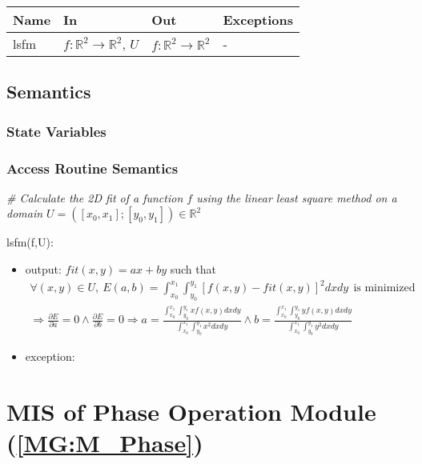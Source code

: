 \documentclass[12pt, titlepage]{article}
\begin{document}
\begin{center}
\begin{tabular}{p{2cm} p{4cm} p{4cm} p{2cm}}
\hline
\textbf{Name} & \textbf{In} & \textbf{Out} & \textbf{Exceptions} \\
\hline
lsfm & $f:\mathbb{R}^2\rightarrow\mathbb{R}^2$, $U$ & $f:\mathbb{R}^2\rightarrow\mathbb{R}^2$ & - \\
\hline
\end{tabular}
\end{center}

\subsection{Semantics}

\subsubsection{State Variables}


\subsubsection{Access Routine Semantics}

\noindent\textit{{\#} Calculate the 2D fit of a function $f$ using the linear least square method on a domain $U=([x_0,x_1];[y_0,y_1]) \in \mathbb{R}^2$} \medskip

\noindent lsfm(f,U):
\begin{itemize}
\item output: $fit(x,y)=ax + by$ such that
\begin{equation*}
\begin{gathered}
\forall (x,y) \in U, \ E(a,b)=\int_{x_0}^{x_1}\int_{y_0}^{y_1}[f(x,y)-fit(x,y)]^2dxdy \ \ \text{is minimized} \\
\Rightarrow \frac{\partial E}{\partial a} =0 \wedge \frac{\partial E}{\partial b} =0
\Rightarrow a = \frac{\int_{x_0}^{x_1}\int_{y_0}^{y_1}xf(x,y)dxdy}{\int_{x_0}^{x_1}\int_{y_0}^{y_1}x^2dxdy} \wedge  b= \frac{\int_{x_0}^{x_1}\int_{y_0}^{y_1}yf(x,y)dxdy}{\int_{x_0}^{x_1}\int_{y_0}^{y_1}y^2dxdy}
\end{gathered}
\end{equation*}
\item exception:
\end{itemize}


\section{MIS of Phase Operation Module (\texorpdfstring{\cref{MG:M_Phase}}))} \label{MIS_Phase}
\end{document}
